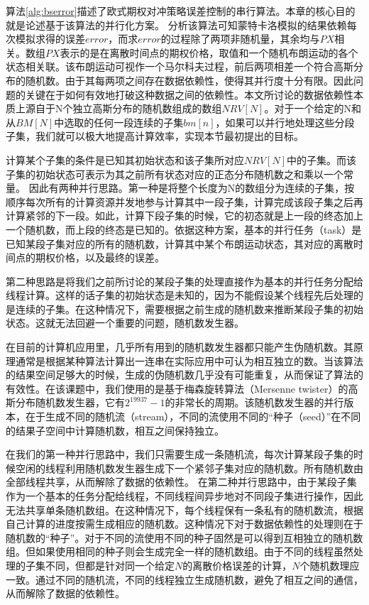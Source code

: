 算法\ref{alg:bserror}描述了欧式期权对冲策略误差控制的串行算法。本章的核心目的就是论述基于该算法的并行化方案。
分析该算法可知蒙特卡洛模拟的结果依赖每次模拟求得的误差$error$，而求$error$的过程除了两项非随机量，其余均与$PX$相关。数组$PX$表示的是在离散时间点的期权价格，取值和一个随机布朗运动的各个状态相关联。该布朗运动可视作一个马尔科夫过程，前后两项相差一个符合高斯分布的随机数。由于其每两项之间存在数据依赖性，使得其并行度十分有限。因此问题的关键在于如何有效地打破这种数据之间的依赖性。本文所讨论的数据依赖性本质上源自于N个独立高斯分布的随机数组成的数组$NRV[N]$。对于一个给定的N和从$BM[N]$中选取的任何一段连续的子集$bm[n]$，如果可以并行地处理这些分段子集，我们就可以极大地提高计算效率，实现本节最初提出的目标。

计算某个子集的条件是已知其初始状态和该子集所对应$NRV[N]$中的子集。而该子集的初始状态可表示为其之前所有状态对应的正态分布随机数之和乘以一个常量。
因此有两种并行思路。第一种是将整个长度为N的数组分为连续的子集，按顺序每次所有的计算资源并发地参与计算其中一段子集，计算完成该段子集之后再计算紧邻的下一段。如此，计算下段子集的时候，它的初态就是上一段的终态加上一个随机数，而上段的终态是已知的。依据这种方案，基本的并行任务（task）是已知某段子集对应的所有的随机数，计算其中某个布朗运动状态，其对应的离散时间点的期权价格，以及最终的误差。

第二种思路是将我们之前所讨论的某段子集的处理直接作为基本的并行任务分配给线程计算。这样的话子集的初始状态是未知的，因为不能假设某个线程先后处理的是连续的子集。在这种情况下，需要根据之前生成的随机数来推断某段子集的初始状态。这就无法回避一个重要的问题，随机数发生器。

在目前的计算机应用里，几乎所有用到的随机数发生器都只能产生伪随机数。其原理通常是根据某种算法计算出一连串在实际应用中可认为相互独立的数。当该算法的结果空间足够大的时候，生成的伪随机数几乎没有可能重复，从而保证了算法的有效性。在该课题中，我们使用的是基于梅森旋转算法（Mersenne twister）的高斯分布随机数发生器，它有$2^{19937}-1$的非常长的周期。该随机数发生器的并行版本，在于生成不同的随机流（stream），不同的流使用不同的“种子（seed）”在不同的结果子空间中计算随机数，相互之间保持独立。

在我们的第一种并行思路中，我们只需要生成一条随机流，每次计算某段子集的时候空闲的线程利用随机数发生器生成下一个紧邻子集对应的随机数。所有随机数由全部线程共享，从而解除了数据的依赖性。
在第二种并行思路中，由于某段子集作为一个基本的任务分配给线程，不同线程间异步地对不同段子集进行操作，因此无法共享单条随机数组。在这种情况下，每个线程保有一条私有的随机数流，根据自己计算的进度按需生成相应的随机数。这种情况下对于数据依赖性的处理则在于随机数的“种子”。对于不同的流使用不同的种子固然是可以得到互相独立的随机数组。但如果使用相同的种子则会生成完全一样的随机数组。由于不同的线程虽然处理的子集不同，但都是针对同一个给定$N$的离散价格误差的计算，$N$个随机数理应一致。通过不同的随机流，不同的线程独立生成随机数，避免了相互之间的通信，从而解除了数据的依赖性。

